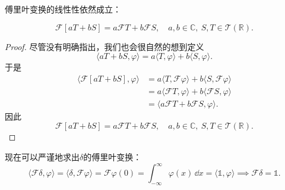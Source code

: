 傅里叶变换的线性性依然成立：
\begin{theorem}[分布的傅里叶变换的线性]
    \begin{equation}
        \mathcal{F}[aT+bS]=a\mathcal{F}T+b\mathcal{F}S,\quad a,b\in\mathbb{C},\ S,T\in\mathcal{T}(\mathbb{R}).
    \end{equation}
\end{theorem}
\begin{proof}
    尽管没有明确指出，我们也会很自然的想到定义
    \begin{equation}
        \langle aT+bS,\varphi\rangle=a\langle T,\varphi\rangle+b\langle S,\varphi\rangle.
    \end{equation}
    于是
    \begin{align}
        \langle \mathcal{F}[aT+bS],\varphi\rangle & =a\langle T,\mathcal{F}\varphi\rangle+b\langle S,\mathcal{F}\varphi\rangle\nonumber \\
                                                  & =a\langle \mathcal{F}T,\varphi\rangle+b\langle \mathcal{F}S,\varphi\rangle\nonumber \\
                                                  & =\langle a\mathcal{F}T+b\mathcal{F}S,\varphi\rangle.
    \end{align}
    因此
    \begin{equation}
        \mathcal{F}[aT+bS]=a\mathcal{F}T+b\mathcal{F}S,\quad a,b\in\mathbb{C},\ S,T\in\mathcal{T}(\mathbb{R}).
    \end{equation}
\end{proof}
\begin{example}
    现在可以严谨地求出$\delta$的傅里叶变换：
    \begin{equation}
        \langle\mathcal{F}\delta,\varphi\rangle=\langle \delta,\mathcal{F}\varphi\rangle=\mathcal{F}\varphi(0)=\int_{-\infty}^{\infty}\varphi(x)\,\dd x=\langle \mathds{1},\varphi\rangle\implies\mathcal{F}\delta=\mathds{1}.
    \end{equation}
\end{example}
